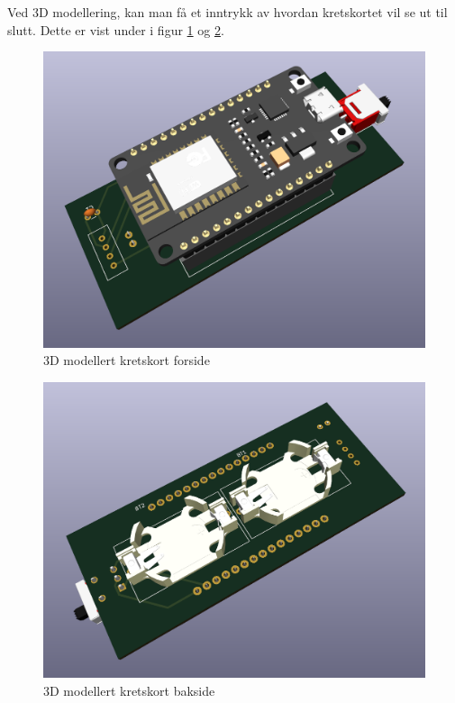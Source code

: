 Ved 3D modellering, kan man få et inntrykk av hvordan kretskortet vil se ut til slutt. Dette er vist under i figur \ref{fig:kretskort forside med komponenter} og \ref{fig:kretskort bakside med komponenter}. \\ 
\begin{minipage}{\linewidth}
    \centering
    \begin{minipage}{0.45\linewidth}
      \begin{figure}[H]
          \includegraphics[width=\linewidth]{rapport/Images/implementering/PCB 3D front.png}
          \caption{3D modellert kretskort forside}
          \label{fig:kretskort forside med komponenter}
      \end{figure}
    \end{minipage}
    \hspace{0.05\linewidth}
    \begin{minipage}{0.45\linewidth}
      \begin{figure}[H]
          \includegraphics[width=\linewidth]{rapport/Images/implementering/PCB 3D back.png}
          \caption{3D modellert kretskort bakside}
          \label{fig:kretskort bakside med komponenter}
      \end{figure}
    \end{minipage}
  \end{minipage}

